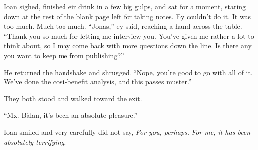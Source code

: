 Ioan sighed, finished eir drink in a few big gulps, and sat for a moment, staring down at the rest of the blank page left for taking notes. Ey couldn't do it. It was too much. Much too much. ``Jonas,'' ey said, reaching a hand across the table. ``Thank you so much for letting me interview you. You've given me rather a lot to think about, so I may come back with more questions down the line. Is there any you want to keep me from publishing?''

He returned the handshake and shrugged. ``Nope, you're good to go with all of it. We've done the cost-benefit analysis, and this passes muster.''

They both stood and walked toward the exit.

``Mx. Bălan, it's been an absolute pleasure.''

Ioan smiled and very carefully did not say, \emph{For you, perhaps. For me, it has been absolutely terrifying.}
